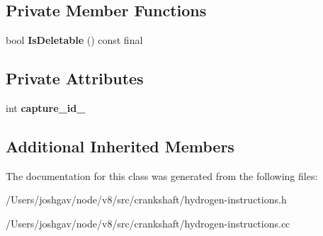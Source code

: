 \subsection*{Private Member Functions}
\begin{DoxyCompactItemize}
\item 
bool {\bfseries Is\+Deletable} () const  final\hypertarget{classv8_1_1internal_1_1_h_captured_object_a70d8053af3b1db7aca5cfafe3a86ac71}{}\label{classv8_1_1internal_1_1_h_captured_object_a70d8053af3b1db7aca5cfafe3a86ac71}

\end{DoxyCompactItemize}
\subsection*{Private Attributes}
\begin{DoxyCompactItemize}
\item 
int {\bfseries capture\+\_\+id\+\_\+}\hypertarget{classv8_1_1internal_1_1_h_captured_object_aaf2fd468dc3b6c8b0e34755495bb1eab}{}\label{classv8_1_1internal_1_1_h_captured_object_aaf2fd468dc3b6c8b0e34755495bb1eab}

\end{DoxyCompactItemize}
\subsection*{Additional Inherited Members}


The documentation for this class was generated from the following files\+:\begin{DoxyCompactItemize}
\item 
/\+Users/joshgav/node/v8/src/crankshaft/hydrogen-\/instructions.\+h\item 
/\+Users/joshgav/node/v8/src/crankshaft/hydrogen-\/instructions.\+cc\end{DoxyCompactItemize}
